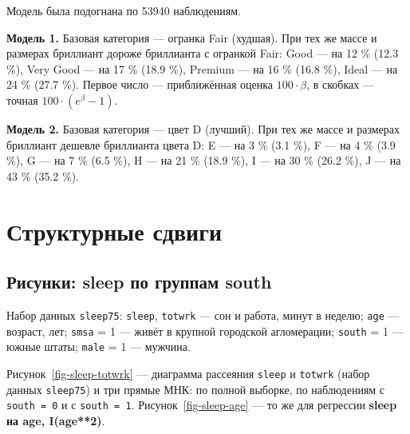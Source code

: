 \documentclass[
  russian,
]{article}
\begin{document}
Модель была подогнана по 53940 наблюдениям.

\begin{tcolorbox}[enhanced jigsaw, arc=.35mm, bottomrule=.15mm, bottomtitle=1mm, breakable, colback=white, colbacktitle=quarto-callout-tip-color!10!white, colframe=quarto-callout-tip-color-frame, coltitle=black, left=2mm, leftrule=.75mm, opacityback=0, opacitybacktitle=0.6, rightrule=.15mm, title=\textcolor{quarto-callout-tip-color}{\faLightbulb}\hspace{0.5em}{Ответ}, titlerule=0mm, toprule=.15mm, toptitle=1mm]

\textbf{Модель 1.} Базовая категория --- огранка Fair (худшая). При тех
же массе и размерах бриллиант дороже бриллианта с огранкой Fair: Good
--- на 12 \% (12.3 \%), Very Good --- на 17 \% (18.9 \%), Premium --- на
16 \% (16.8 \%), Ideal --- на 24 \% (27.7 \%). Первое число ---
приближённая оценка \(100\cdot\beta\), в скобках --- точная
\(100\cdot(e^{\beta}-1)\).

\textbf{Модель 2.} Базовая категория --- цвет D (лучший). При тех же
массе и размерах бриллиант дешевле бриллианта цвета D: E --- на 3 \%
(3.1 \%), F --- на 4 \% (3.9 \%), G --- на 7 \% (6.5 \%), H --- на 21 \%
(18.9 \%), I --- на 30 \% (26.2 \%), J --- на 43 \% (35.2 \%).

\end{tcolorbox}

\section{Структурные
сдвиги}\label{ux441ux442ux440ux443ux43aux442ux443ux440ux43dux44bux435-ux441ux434ux432ux438ux433ux438}

\subsection{Рисунки: sleep по группам
south}\label{ux440ux438ux441ux443ux43dux43aux438-sleep-ux43fux43e-ux433ux440ux443ux43fux43fux430ux43c-south}

Набор данных \texttt{sleep75}: \texttt{sleep}, \texttt{totwrk} --- сон и
работа, минут в неделю; \texttt{age} --- возраст, лет; \texttt{smsa} = 1
--- живёт в крупной городской агломерации; \texttt{south} = 1 --- южные
штаты; \texttt{male} = 1 --- мужчина.

Рисунок~\ref{fig-sleep-totwrk} --- диаграмма рассеяния \texttt{sleep} и
\texttt{totwrk} (набор данных \texttt{sleep75}) и три прямые МНК: по
полной выборке, по наблюдениям с \texttt{south\ =\ 0} и с
\texttt{south\ =\ 1}. Рисунок~\ref{fig-sleep-age} --- то же для
регрессии \textbf{sleep на age, I(age**2)}.
\end{document}
